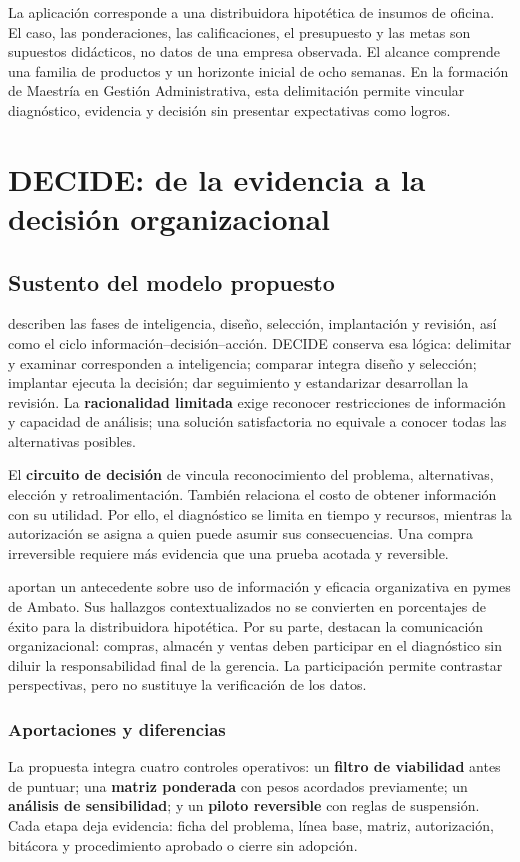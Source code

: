 \documentclass[12pt,spanish,letterpaper,oneside]{article}
\begin{document}
La aplicación corresponde a una distribuidora hipotética de insumos de oficina.
El caso, las ponderaciones, las calificaciones, el presupuesto y las metas son
supuestos didácticos, no datos de una empresa observada. El alcance comprende
una familia de productos y un horizonte inicial de ocho semanas. En la formación
de Maestría en Gestión Administrativa, esta delimitación permite vincular
diagnóstico, evidencia y decisión sin presentar expectativas como logros.

\clearpage
\section{DECIDE: de la evidencia a la decisión organizacional}
\subsection{Sustento del modelo propuesto}
\citet{canos} describen las fases de inteligencia, diseño, selección,
implantación y revisión, así como el ciclo información--decisión--acción.
DECIDE conserva esa lógica: delimitar y examinar corresponden a inteligencia;
comparar integra diseño y selección; implantar ejecuta la decisión; dar seguimiento
y estandarizar desarrollan la revisión. La \textbf{racionalidad limitada} exige
reconocer restricciones de información y capacidad de análisis; una solución
satisfactoria no equivale a conocer todas las alternativas posibles.

El \textbf{circuito de decisión} de \citet{solano2003} vincula reconocimiento del
problema, alternativas, elección y retroalimentación. También relaciona el costo
de obtener información con su utilidad. Por ello, el diagnóstico se limita en
tiempo y recursos, mientras la autorización se asigna a quien puede asumir sus
consecuencias. Una compra irreversible requiere más evidencia que una prueba
acotada y reversible.

\citet{lopez2020} aportan un antecedente sobre uso de información y eficacia
organizativa en pymes de Ambato. Sus hallazgos contextualizados no se convierten
en porcentajes de éxito para la distribuidora hipotética. Por su parte,
\citet{soto2020} destacan la comunicación organizacional: compras, almacén y
ventas deben participar en el diagnóstico sin diluir la responsabilidad final
de la gerencia. La participación permite contrastar perspectivas, pero no
sustituye la verificación de los datos.

\subsubsection{Aportaciones y diferencias}
La propuesta integra cuatro controles operativos: un \textbf{filtro de viabilidad}
antes de puntuar; una \textbf{matriz ponderada} con pesos acordados previamente;
un \textbf{análisis de sensibilidad}; y un \textbf{piloto reversible} con reglas
de suspensión. Cada etapa deja evidencia: ficha del problema, línea base, matriz,
autorización, bitácora y procedimiento aprobado o cierre sin adopción.
\end{document}

